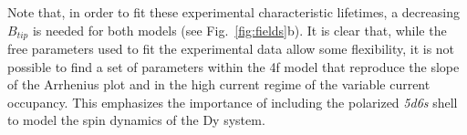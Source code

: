 \documentclass[
reprint,amsmath,amssymb,aps]{revtex4-2}
\begin{document}


Note that, in order to fit these experimental characteristic lifetimes, a decreasing $B_{tip}$ is needed for both models (see Fig.~\ref{fig:fields}b). It is clear that, while the free parameters used to fit the experimental data allow some flexibility, it is not possible to find a set of parameters within the 4f model that reproduce the slope of the Arrhenius plot and in the high current regime of the variable current occupancy. This emphasizes the importance of including the polarized \textit{5d6s} shell to model the spin dynamics of the Dy system.
\end{document}
